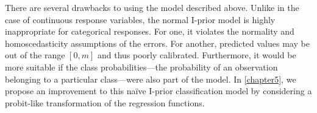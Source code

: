 There are several drawbacks to using the model described above.
Unlike in the case of continuous response variables, the normal I-prior model is highly inappropriate for categorical responses.
For one, it violates the normality and homoscedasticity assumptions of the errors.
For another, predicted values may be out of the range $[0,m]$ and thus poorly calibrated.
Furthermore, it would be more suitable if the class probabilities---the probability of an observation belonging to a particular class---were also part of the model.
In \cref{chapter5}, we propose an improvement to this naïve I-prior classification model by considering a probit-like transformation of the regression functions.

%  
%  
%  
%  

